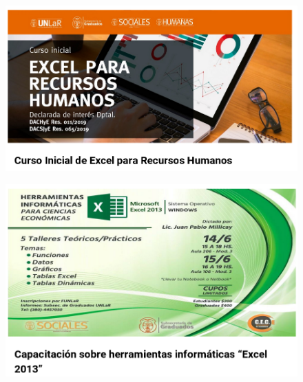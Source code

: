 \documentclass{fancyslides}
\begin{document}
\begin{frame}
\begin{figure}
	\centering
	\includegraphics[width=1\linewidth]{images/excel2}
	\caption{}
	\label{fig:excel2}
\end{figure}

\end{frame}

\begin{frame}
	\begin{figure}
		\centering
		\includegraphics[width=1\linewidth]{images/excel3}
		\caption{}
		\label{fig:excel3}
	\end{figure}
	
\end{frame}
\end{document}
